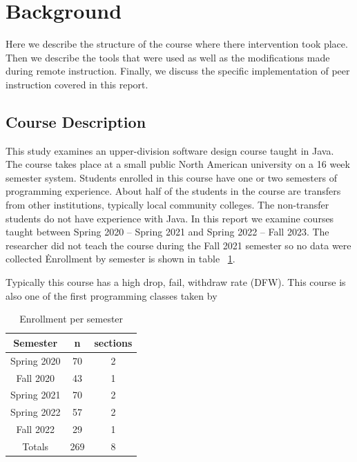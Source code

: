 \documentclass[12pt]{article}
\begin{document}
\section{Background}

Here we describe the structure of the course where there intervention took place. Then we describe the tools that were used as well as the modifications made during remote instruction. Finally, we discuss the specific implementation of peer instruction covered in this report.

\subsection{Course Description}
This study examines an upper-division software design course taught in Java. The course takes place at a small public North American university on a 16 week semester system. Students enrolled in this course have one or two semesters of programming experience. About half of the students in the course are transfers from other institutions, typically local community colleges. The non-transfer students do not have experience with Java. 
In this report we examine courses taught between Spring 2020 – Spring 2021 and Spring 2022 – Fall 2023.  The researcher did not teach the course during the Fall 2021 semester so no data were collected \. Enrollment by semester is shown in table ~\ref{table:enrollmentBySemester}.

Typically this course has a high drop, fail, withdraw rate (DFW).  This course is also one of the first programming classes taken by

\begin{table}[ht]
\centering
\caption{Enrollment per semester}
\begin{tabular}{|c|c|c|}
\toprule
Semester    & n  & sections\\ \midrule
\rowcolor{LightGray}
Spring 2020 & 70 & 2 \\ \midrule
Fall 2020   & 43 & 1 \\ \midrule
\rowcolor{LightGray}
Spring 2021 & 70 & 2 \\ \midrule
Spring 2022 & 57 & 2 \\ \midrule
\rowcolor{LightGray}
Fall 2022 & 29 & 1 \\ \midrule
Totals & 269 & 8 \\ \bottomrule
\end{tabular}
\label{table:enrollmentBySemester}
\end{table}
\end{document}
